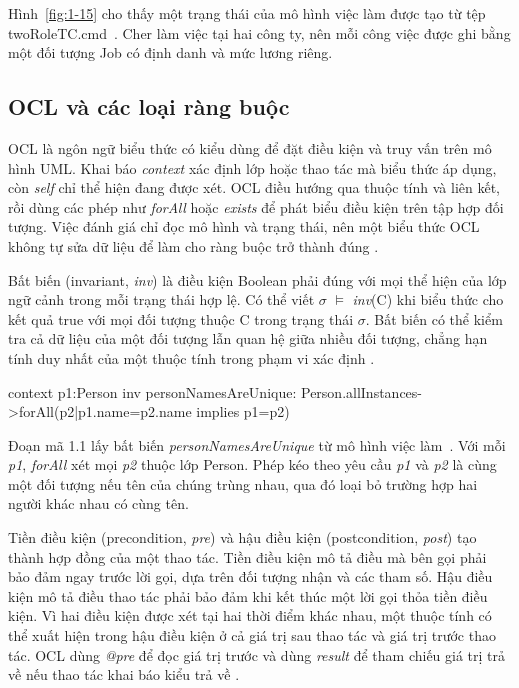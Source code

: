 \documentclass[12pt,a4paper,oneside]{extreport}
\newcommand{\thesisdisplaytitle}[2]{%
  \par\smallskip\noindent\makebox[\linewidth][c]{\small\textbf{#1}\ #2}\par\nobreak}
\begin{document}
Hình~\ref{fig:1-15} cho thấy một trạng thái của mô hình việc làm được tạo từ tệp twoRoleTC.cmd~\cite{ref-16}. Cher làm việc tại hai công ty, nên mỗi công việc được ghi bằng một đối tượng Job có định danh và mức lương riêng.

\subsection{OCL và các loại ràng buộc}\label{sec:1-5-2}

OCL là ngôn ngữ biểu thức có kiểu dùng để đặt điều kiện và truy vấn trên mô hình UML. Khai báo \textit{context} xác định lớp hoặc thao tác mà biểu thức áp dụng, còn \textit{self} chỉ thể hiện đang được xét. OCL điều hướng qua thuộc tính và liên kết, rồi dùng các phép như \textit{forAll} hoặc \textit{exists} để phát biểu điều kiện trên tập hợp đối tượng. Việc đánh giá chỉ đọc mô hình và trạng thái, nên một biểu thức OCL không tự sửa dữ liệu để làm cho ràng buộc trở thành đúng \cite{ref-15}.

Bất biến (invariant, \textit{inv}) là điều kiện Boolean phải đúng với mọi thể hiện của lớp ngữ cảnh trong mỗi trạng thái hợp lệ. Có thể viết \(\sigma\) \(\vDash\) \textit{inv}(C) khi biểu thức cho kết quả true với mọi đối tượng thuộc C trong trạng thái \(\sigma\). Bất biến có thể kiểm tra cả dữ liệu của một đối tượng lẫn quan hệ giữa nhiều đối tượng, chẳng hạn tính duy nhất của một thuộc tính trong phạm vi xác định \cite{ref-15}.

\begin{samepage}

\thesisdisplaytitle{Đoạn mã 1.1}{Bất biến \textit{personNamesAreUnique}}

\begin{thesiscode}
context p1:Person inv personNamesAreUnique:
    Person.allInstances->forAll(p2|p1.name=p2.name implies p1=p2)
\end{thesiscode}

\end{samepage}

Đoạn mã 1.1 lấy bất biến \textit{personNamesAreUnique} từ mô hình việc làm~\cite{ref-16}. Với mỗi \textit{p1}, \textit{forAll} xét mọi \textit{p2} thuộc lớp Person. Phép kéo theo yêu cầu \textit{p1} và \textit{p2} là cùng một đối tượng nếu tên của chúng trùng nhau, qua đó loại bỏ trường hợp hai người khác nhau có cùng tên.

Tiền điều kiện (precondition, \textit{pre}) và hậu điều kiện (postcondition, \textit{post}) tạo thành hợp đồng của một thao tác. Tiền điều kiện mô tả điều mà bên gọi phải bảo đảm ngay trước lời gọi, dựa trên đối tượng nhận và các tham số. Hậu điều kiện mô tả điều thao tác phải bảo đảm khi kết thúc một lời gọi thỏa tiền điều kiện. Vì hai điều kiện được xét tại hai thời điểm khác nhau, một thuộc tính có thể xuất hiện trong hậu điều kiện ở cả giá trị sau thao tác và giá trị trước thao tác. OCL dùng \textit{@pre} để đọc giá trị trước và dùng \textit{result} để tham chiếu giá trị trả về nếu thao tác khai báo kiểu trả về \cite{ref-15}.
\end{document}
